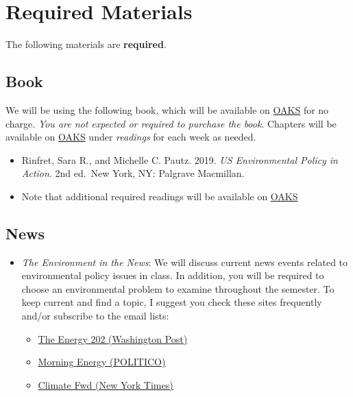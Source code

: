 \hypertarget{required-materials}{%
\section{Required Materials}\label{required-materials}}

The following materials are \textbf{required}.

\hypertarget{book}{%
\subsection{Book}\label{book}}

We will be using the following book, which will be available on
\href{https://lms.cofc.edu}{OAKS} for no charge. \emph{You are not
expected or required to purchase the book}. Chapters will be available
on \href{https://lms.cofc.edu}{OAKS} under \emph{readings} for each week
as needed.

\begin{itemize}
\item
  Rinfret, Sara R., and Michelle C. Pautz. 2019. \emph{US Environmental
  Policy in Action}. 2nd ed.~New York, NY: Palgrave Macmillan.
\item
  Note that additional required readings will be available on
  \href{https://lms.cofc.edu}{OAKS}
\end{itemize}

\hypertarget{news}{%
\subsection{News}\label{news}}

\begin{itemize}

\item
  \faNewspaperO \hspace{0.005in} \emph{The Environment in the News}: We
  will discuss current news events related to environmental policy
  issues in class. In addition, you will be required to choose an
  environmental problem to examine throughout the semester. To keep
  current and find a topic, I suggest you check these sites frequently
  and/or subscribe to the email lists:

  \begin{itemize}
  
  \item
    \href{https://www.washingtonpost.com/politics/powerpost/the-energy-202/}{The
    Energy 202 (Washington Post)}
  \item
    \href{https://www.politico.com/morningenergy/}{Morning Energy
    (POLITICO)}
  \item
    \href{https://www.nytimes.com/column/climate-fwd}{Climate Fwd (New
    York Times)}
  \end{itemize}
\end{itemize}

